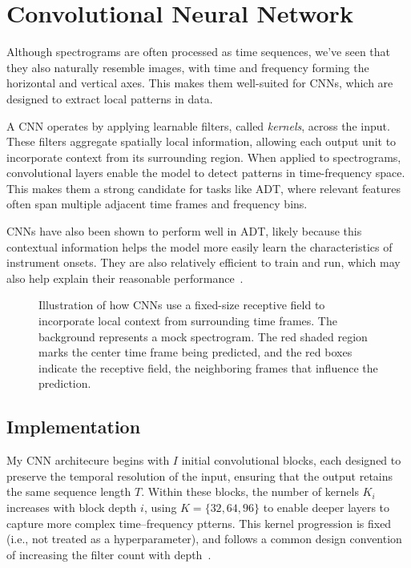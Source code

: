 \section{Convolutional Neural Network}

Although spectrograms are often processed as time sequences, we've seen that they also naturally resemble images, with time and frequency forming the horizontal and vertical axes. This makes them well-suited for \glspl{CNN}, which are designed to extract local patterns in data.

A \gls{CNN} operates by applying learnable filters, called \textit{kernels}, across the input. These filters aggregate spatially local information, allowing each output unit to incorporate context from its surrounding region. When applied to spectrograms, convolutional layers enable the model to detect patterns in time-frequency space. This makes them a strong candidate for tasks like \gls{ADT}, where relevant features often span multiple adjacent time frames and frequency bins.

\glspl{CNN} have also been shown to perform well in \gls{ADT}, likely because this contextual information helps the model more easily learn the characteristics of instrument onsets. They are also relatively efficient to train and run, which may also help explain their reasonable performance~\cite{Vogl2017DrumTV}.

\begin{figure}[H]
    \centering
    
    \caption{Illustration of how \glspl{CNN} use a fixed-size receptive field to incorporate local context from surrounding time frames. The background represents a mock spectrogram. The red shaded region marks the center time frame being predicted, and the red boxes indicate the receptive field, the neighboring frames that influence the prediction.}
    \label{CNNInfluenceFigure}
\end{figure}

\subsection{Implementation}

My \gls{CNN} architecure begins with $I$ initial convolutional blocks, each designed to preserve the temporal resolution of the input, ensuring that the output retains the same sequence length $T$. Within these blocks, the number of kernels $K_i$ increases with block depth $i$, using $K = \{32, 64, 96\}$ to enable deeper layers to capture more complex time–frequency ptterns. This kernel progression is fixed (i.e., not treated as a hyperparameter), and follows a common design convention of increasing the filter count with depth~\cite{simonyan2014very}.

